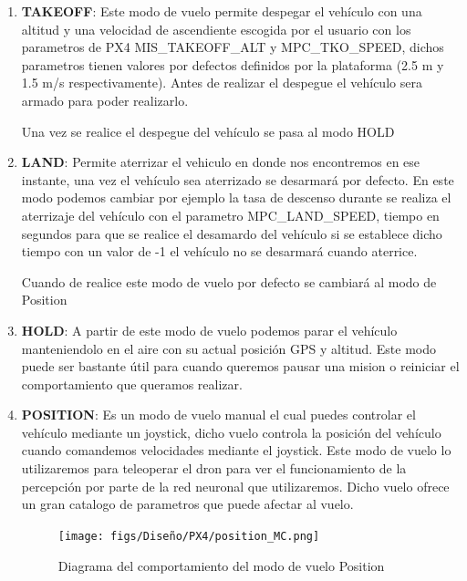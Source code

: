   \begin{enumerate}
    \item \textbf{TAKEOFF}: Este modo de vuelo permite despegar el vehículo con una altitud y una velocidad de ascendiente escogida por el usuario con los parametros de PX4 MIS\_TAKEOFF\_ALT y
    MPC\_TKO\_SPEED, dichos parametros tienen valores por defectos definidos por la plataforma (2.5 m y 1.5 m/s respectivamente). Antes de realizar el despegue el vehículo sera armado 
    para poder realizarlo.

    Una vez se realice el despegue del vehículo se pasa al modo HOLD 
    \item \textbf{LAND}: Permite aterrizar el vehiculo en donde nos encontremos en ese instante, una vez el vehículo sea aterrizado se desarmará por defecto. En este modo podemos cambiar por ejemplo
    la tasa de descenso durante se realiza el aterrizaje del vehículo con el parametro MPC\_LAND\_SPEED, tiempo en segundos para que se realice el desamardo del vehículo si se establece dicho tiempo
    con un valor de -1 el vehículo no se desarmará cuando aterrice.
    
    Cuando de realice este modo de vuelo por defecto se cambiará al modo de Position

    \item \textbf{HOLD}: A partir de este modo de vuelo podemos parar el vehículo manteniendolo en el aire con su actual posición GPS y altitud. Este modo puede ser bastante útil para cuando queremos
    pausar una mision o reiniciar el comportamiento que queramos realizar. 

    \item \textbf{POSITION}: Es un modo de vuelo manual el cual puedes controlar el vehículo mediante un joystick, dicho vuelo controla la posición del vehículo cuando comandemos velocidades 
    mediante el joystick. Este modo de vuelo lo utilizaremos para teleoperar el dron para ver el funcionamiento de la percepción por parte de la red neuronal que utilizaremos.
    Dicho vuelo ofrece un gran catalogo de parametros que puede afectar al vuelo.

    \begin{figure} [H]
      \begin{center}
        \texttt{[image: figs/Diseño/PX4/position\_MC.png]}
      \end{center}
      \caption{Diagrama del comportamiento del modo de vuelo Position}
      \label{fig:position_mode_px4}
    \end{figure}\


\end{enumerate}
